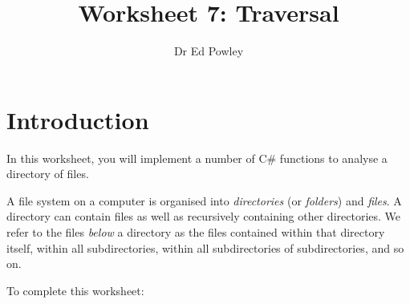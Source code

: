 \documentclass{../../../fal_assignment}
\title{Worksheet 7: Traversal}
\author{Dr Ed Powley}
\begin{document}
\maketitle

\section*{Introduction}

In this worksheet, you will implement a number of C\# functions to analyse a directory of files.

A file system on a computer is organised into \emph{directories} (or \emph{folders}) and \emph{files}.
A directory can contain files as well as recursively containing other directories.
We refer to the files \emph{below} a directory as the files contained within that directory itself,
within all subdirectories, within all subdirectories of subdirectories, and so on.

To complete this worksheet:
\end{document}

